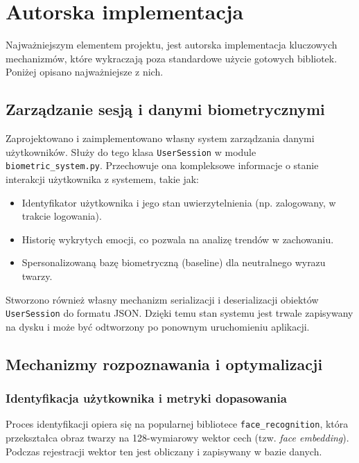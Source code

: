 \chapter{Autorska implementacja}
\label{chap:implementacja}

Najważniejszym elementem projektu, jest autorska implementacja kluczowych mechanizmów, które wykraczają poza standardowe użycie gotowych bibliotek. Poniżej opisano najważniejsze z nich.

\section{Zarządzanie sesją i danymi biometrycznymi}
Zaprojektowano i zaimplementowano własny system zarządzania danymi użytkowników. Służy do tego klasa \texttt{UserSession} w module \texttt{biometric\_system.py}. Przechowuje ona kompleksowe informacje o stanie interakcji użytkownika z systemem, takie jak:
\begin{itemize}
    \item Identyfikator użytkownika i jego stan uwierzytelnienia (np. zalogowany, w trakcie logowania).
    \item Historię wykrytych emocji, co pozwala na analizę trendów w zachowaniu.
    \item Spersonalizowaną bazę biometryczną (baseline) dla neutralnego wyrazu twarzy.
\end{itemize}

Stworzono również własny mechanizm serializacji i deserializacji obiektów \texttt{UserSession} do formatu JSON. Dzięki temu stan systemu jest trwale zapisywany na dysku i może być odtworzony po ponownym uruchomieniu aplikacji.

\section{Mechanizmy rozpoznawania i optymalizacji}

\subsection{Identyfikacja użytkownika i metryki dopasowania}
Proces identyfikacji opiera się na popularnej bibliotece \texttt{face\_recognition}, która przekształca obraz twarzy na 128-wymiarowy wektor cech (tzw. \textit{face embedding}). Podczas rejestracji wektor ten jest obliczany i zapisywany w bazie danych.

